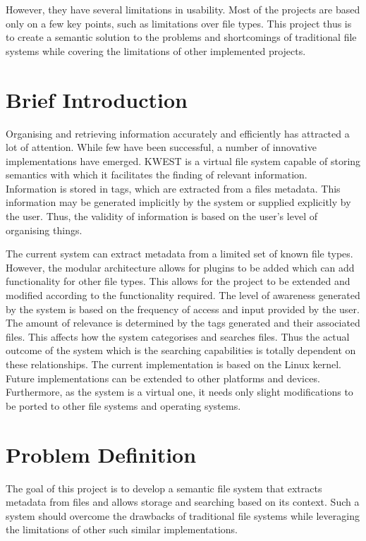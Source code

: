 However, they have several limitations in usability. Most of the projects are based only on a few key points, such as limitations over file types. This project thus is to create a semantic solution to the problems and shortcomings of traditional file systems while covering the limitations of other implemented projects.

\section{Brief Introduction}
Organising and retrieving information accurately and efficiently has attracted a lot of attention. While few have been successful, a number of innovative implementations have emerged. KWEST is a virtual file system capable of storing semantics with which it facilitates the finding of relevant information. Information is stored in tags, which are extracted from a files metadata. This information may be generated implicitly by the system or supplied explicitly by the user. Thus, the validity of information is based on the user's level of organising things.

The current system can extract metadata from a limited set of known file types. However, the modular architecture allows for plugins to be added which can add functionality for other file types. This allows for the project to be extended and modified according to the functionality required. The level of awareness generated by the system is based on the frequency of access and input provided by the user. The amount of relevance is determined by the tags generated and their associated files. This affects how the system categorises and searches files. Thus the actual outcome of the system which is the searching capabilities is totally dependent on these relationships. The current implementation is based on the Linux kernel. Future implementations can be extended to other platforms and devices. Furthermore, as the system is a virtual one, it needs only slight modifications to be ported to other file systems and operating systems.

\section{Problem Definition}
The goal of this project is to develop a semantic file system that extracts metadata from files and allows storage and searching based on its context. Such a system should overcome the drawbacks of traditional file systems while leveraging the limitations of other such similar implementations.
		
